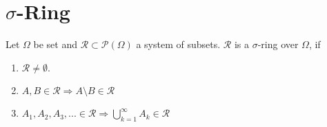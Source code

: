 \section{\(\sigma\)-Ring}
\begin{definition}
    Let \(\Omega\) be set and \(\mathcal{R} \subset \mathcal{P}(\Omega)\) a system of subsets. \(\mathcal{R}\) is a \(\sigma\)-ring over \(\Omega\), if
        \begin{enumerate}
            \item \(\mathcal{R} \neq \emptyset\).
            \item \(A, B \in \mathcal{R} \Rightarrow A \setminus B \in \mathcal{R}\)
            \item \(A_1, A_2, A_3, ... \in \mathcal{R} \Rightarrow \bigcup_{k=1}^\infty A_k \in \mathcal{R}\)
        \end{enumerate}
\end{definition}
%
%
%
%
%
